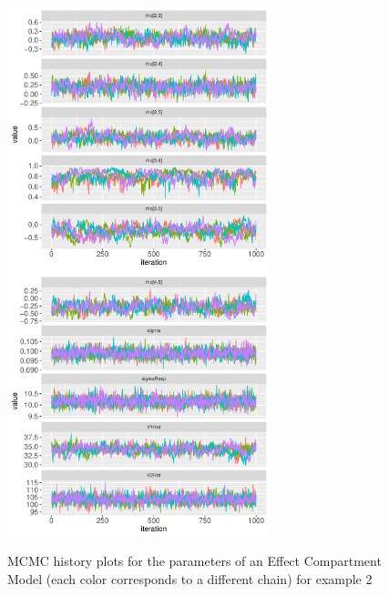 \documentclass[11pt]{amsart}
\begin{document}
\begin{figure}[htbp]
\includegraphics[width=3.0in,trim=0in 0in 0 0in]{graphics/effCptModelTorsten/effCptModelTorstenPlots004.pdf}
\includegraphics[width=3.0in,trim=0in 0in 0 0in]{graphics/effCptModelTorsten/effCptModelTorstenPlots005.pdf}
\caption{{MCMC history plots for the parameters of an Effect Compartment Model (each color corresponds to a different chain) for example 2}}
\label{effCptModelMCMC}
\end{figure}
\end{document}
